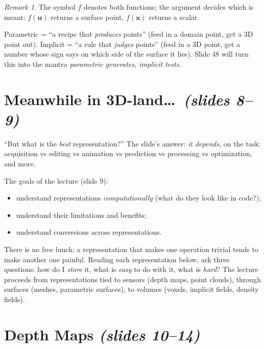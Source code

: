 \documentclass[11pt,a4paper]{article}
\newcommand{\vx}{\bm{x}}
\newcommand{\vu}{\bm{u}}
\theoremstyle{definition}
\theoremstyle{plain}
\theoremstyle{remark}
\newtheorem{remark}[definition]{Remark}
\newcommand{\slides}[1]{\texorpdfstring{\emph{(#1)}}{(#1)}}
\begin{document}
\begin{remark}
The symbol $f$ denotes both functions; the argument decides which is meant: $f(\vu)$ returns a surface point, $f(\vx)$ returns a scalar.
\end{remark}

\begin{intuition}
Parametric = ``a recipe that \emph{produces} points'' (feed in a domain point, get a 3D point out). Implicit = ``a rule that \emph{judges} points'' (feed in a 3D point, get a number whose sign says on which side of the surface it lies). Slide 48 will turn this into the mantra \emph{parametric generates, implicit tests}.
\end{intuition}

\section{Meanwhile in 3D-land\dots\ \slides{slides 8--9}}

``But what is the \emph{best} representation?'' The slide's answer: \emph{it depends}, on the task: acquisition vs editing vs animation vs prediction vs processing vs optimization, and more.

The goals of the lecture (slide 9):
\begin{itemize}[nosep]
\item understand representations \emph{computationally} (what do they look like in code?);
\item understand their limitations and benefits;
\item understand conversions across representations.
\end{itemize}

\begin{intuition}
There is no free lunch: a representation that makes one operation trivial tends to make another one painful. Reading each representation below, ask three questions: how do I \emph{store} it, what is \emph{easy} to do with it, what is \emph{hard}?
The lecture proceeds from representations tied to sensors (depth maps, point clouds), through surfaces (meshes, parametric surfaces), to volumes (voxels, implicit fields, density fields).
\end{intuition}

\section{Depth Maps \slides{slides 10--14}}
\end{document}
